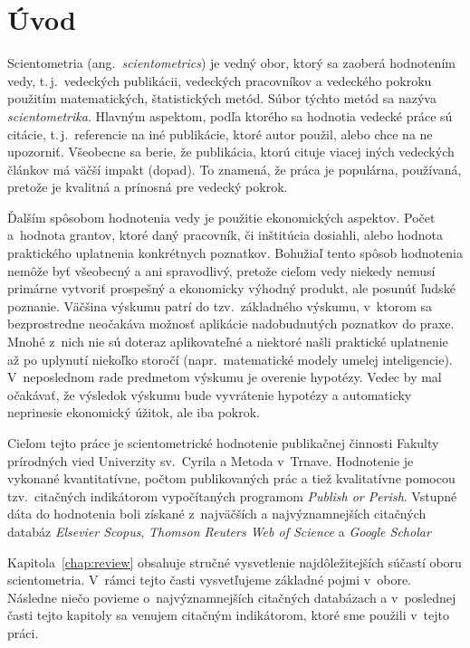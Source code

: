 \chapter*{Úvod}

Scientometria (ang.~\emph{scientometrics}) je vedný obor, ktorý sa zaoberá
hodnotením vedy, t.\,j.~vedeckých publikácii, vedeckých pracovníkov a vedeckého
pokroku použitím matematických, štatistických metód.  Súbor týchto metód sa
nazýva \emph{scientometrika}.  Hlavným aspektom, podľa ktorého sa hodnotia
vedecké práce sú citácie, t.\,j.~referencie na iné publikácie, ktoré autor
použil, alebo chce na ne upozorniť.  Všeobecne sa berie, že publikácia, ktorú
cituje viacej iných vedeckých článkov má väčší impakt (dopad).  To znamená, že
práca je populárna, používaná, pretože je kvalitná a prínosná pre vedecký
pokrok.

Ďalším spôsobom hodnotenia vedy je použitie ekonomických aspektov.  Počet
a~hodnota grantov, ktoré daný pracovník, či inštitúcia dosiahli, alebo hodnota
praktického uplatnenia konkrétnych poznatkov.  Bohužiaľ tento spôsob hodnotenia
nemôže byť všeobecný a ani spravodlivý, pretože cieľom vedy niekedy nemusí
primárne vytvoriť prospešný a ekonomicky výhodný produkt, ale posunúť ľudské
poznanie.  Väčšina výskumu patrí do tzv.~základného výskumu, v~ktorom sa
bezprostredne neočakáva možnosť aplikácie nadobudnutých poznatkov do praxe.
Mnohé z~nich nie sú doteraz aplikovateľné a niektoré našli praktické uplatnenie
až po uplynutí niekoľko storočí (napr.~matematické modely umelej inteligencie).
V~neposlednom rade predmetom výskumu je overenie hypotézy.  Vedec by mal
očakávať, že výsledok výskumu bude vyvrátenie hypotézy a automaticky neprinesie
ekonomický úžitok, ale iba pokrok.

Cieľom tejto práce je scientometrické hodnotenie publikačnej činnosti Fakulty
prírodných vied Univerzity sv.~Cyrila a Metoda v~Trnave.  Hodnotenie je
vykonané kvantitatívne, počtom publikovaných prác a tiež kvalitatívne pomocou
tzv.~citačných indikátorom vypočítaných programom \emph{Publish or Perish}.
Vstupné dáta do hodnotenia boli získané z~najväčších a najvýznamnejších
citačných databáz \emph{Elsevier Scopus}, \emph{Thomson Reuters Web of Science}
a \emph{Google Scholar}

Kapitola~\ref{chap:review} obsahuje stručné vysvetlenie najdôležitejších súčastí
oboru scientometria. V~rámci tejto časti vysvetľujeme základné pojmi v~obore.
Následne niečo povieme o~najvýznamnejších citačných databázach a v~poslednej
časti tejto kapitoly sa venujem citačným indikátorom, ktoré sme použili v~tejto
práci.


